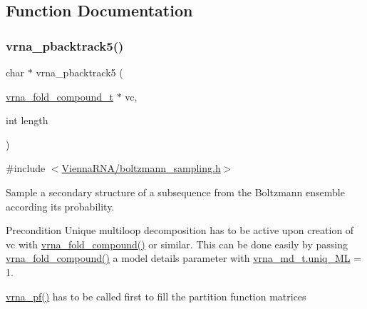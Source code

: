 \subsection{Function Documentation}
\mbox{\label{group__subopt__stochbt_ga347375a4da8bdff74639529847f97d4f}} 
\subsubsection{\texorpdfstring{vrna\+\_\+pbacktrack5()}{vrna\_pbacktrack5()}}
{\footnotesize\ttfamily char $\ast$ vrna\+\_\+pbacktrack5 (\begin{DoxyParamCaption}\item[{\hyperlink{group__fold__compound_ga1b0cef17fd40466cef5968eaeeff6166}{vrna\+\_\+fold\+\_\+compound\+\_\+t} $\ast$}]{vc,  }\item[{int}]{length }\end{DoxyParamCaption})}



{\ttfamily \#include $<$\hyperlink{boltzmann__sampling_8h}{Vienna\+R\+N\+A/boltzmann\+\_\+sampling.\+h}$>$}



Sample a secondary structure of a subsequence from the Boltzmann ensemble according its probability. 

\begin{DoxyPrecond}{Precondition}
Unique multiloop decomposition has to be active upon creation of {\ttfamily vc} with \hyperlink{group__fold__compound_ga6601d994ba32b11511b36f68b08403be}{vrna\+\_\+fold\+\_\+compound()} or similar. This can be done easily by passing \hyperlink{group__fold__compound_ga6601d994ba32b11511b36f68b08403be}{vrna\+\_\+fold\+\_\+compound()} a model details parameter with \hyperlink{group__model__details_ade065b814a4e2e72ead93ab502613ed2}{vrna\+\_\+md\+\_\+t.\+uniq\+\_\+\+ML} = 1. 

\hyperlink{group__part__func__global_ga29e256d688ad221b78d37f427e0e99bc}{vrna\+\_\+pf()} has to be called first to fill the partition function matrices
\end{DoxyPrecond}

